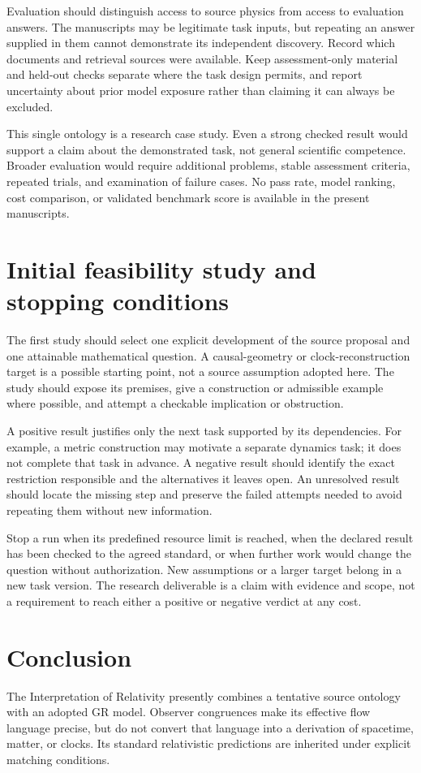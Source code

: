 \documentclass[11pt]{article}
\begin{document}
Evaluation should distinguish access to source physics from access to evaluation answers. The manuscripts may be legitimate task inputs, but repeating an answer supplied in them cannot demonstrate its independent discovery. Record which documents and retrieval sources were available. Keep assessment-only material and held-out checks separate where the task design permits, and report uncertainty about prior model exposure rather than claiming it can always be excluded.

This single ontology is a research case study. Even a strong checked result would support a claim about the demonstrated task, not general scientific competence. Broader evaluation would require additional problems, stable assessment criteria, repeated trials, and examination of failure cases. No pass rate, model ranking, cost comparison, or validated benchmark score is available in the present manuscripts.

\section{Initial feasibility study and stopping conditions}
The first study should select one explicit development of the source proposal and one attainable mathematical question. A causal-geometry or clock-reconstruction target is a possible starting point, not a source assumption adopted here. The study should expose its premises, give a construction or admissible example where possible, and attempt a checkable implication or obstruction.

A positive result justifies only the next task supported by its dependencies. For example, a metric construction may motivate a separate dynamics task; it does not complete that task in advance. A negative result should identify the exact restriction responsible and the alternatives it leaves open. An unresolved result should locate the missing step and preserve the failed attempts needed to avoid repeating them without new information.

Stop a run when its predefined resource limit is reached, when the declared result has been checked to the agreed standard, or when further work would change the question without authorization. New assumptions or a larger target belong in a new task version. The research deliverable is a claim with evidence and scope, not a requirement to reach either a positive or negative verdict at any cost.

\section{Conclusion}
The \Aflow{} Interpretation of Relativity presently combines a tentative source ontology with an adopted GR model. Observer congruences make its effective flow language precise, but do not convert that language into a derivation of spacetime, matter, or clocks. Its standard relativistic predictions are inherited under explicit matching conditions.
\end{document}

